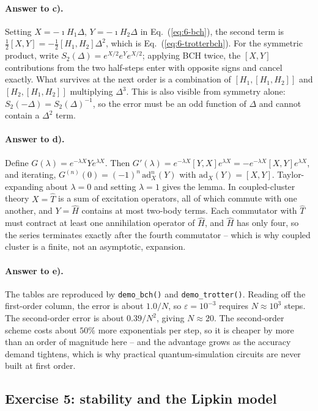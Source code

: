 \paragraph{Answer to c).}
Setting $X=-\imath H_1\Delta$, $Y=-\imath H_2\Delta$ in
Eq.~(\ref{eq:6-bch}), the second term is
$\tfrac12[X,Y]=-\tfrac12[H_1,H_2]\Delta^2$, which is
Eq.~(\ref{eq:6-trotterbch}).  For the symmetric product, write
$S_2(\Delta)=e^{X/2}e^{Y}e^{X/2}$; applying BCH twice, the $[X,Y]$
contributions from the two half-steps enter with opposite signs and cancel
exactly.  What survives at the next order is a combination of
$[H_1,[H_1,H_2]]$ and $[H_2,[H_1,H_2]]$ multiplying $\Delta^3$.  This is also
visible from symmetry alone: $S_2(-\Delta)=S_2(\Delta)^{-1}$, so the error
must be an odd function of $\Delta$ and cannot contain a $\Delta^2$ term.

\paragraph{Answer to d).}
Define $G(\lambda)=e^{-\lambda X}Ye^{\lambda X}$.  Then
$G'(\lambda)=e^{-\lambda X}[Y,X]e^{\lambda X}=-e^{-\lambda X}[X,Y]
e^{\lambda X}$, and iterating,
$G^{(n)}(0)=(-1)^n\,\mathrm{ad}_X^n(Y)$ with
$\mathrm{ad}_X(Y)=[X,Y]$.  Taylor-expanding about $\lambda=0$ and setting
$\lambda=1$ gives the lemma.  In coupled-cluster theory $X=\hat{T}$ is a
sum of excitation operators, all of which commute with one another, and
$Y=\hat{H}$ contains at most two-body terms.  Each commutator with $\hat{T}$
must contract at least one annihilation operator of $\hat{H}$, and $\hat{H}$
has only four, so the series terminates exactly after the fourth commutator --
which is why coupled cluster is a finite, not an asymptotic, expansion.

\paragraph{Answer to e).}
The tables are reproduced by \texttt{demo\_bch()} and
\texttt{demo\_trotter()}.  Reading off the first-order column, the error is
about $1.0/N$, so $\varepsilon=10^{-3}$ requires $N\approx10^{3}$ steps.  The
second-order error is about $0.39/N^2$, giving $N\approx20$.  The second-order
scheme costs about $50\%$ more exponentials per step, so it is cheaper by more
than an order of magnitude here -- and the advantage grows as the accuracy
demand tightens, which is why practical quantum-simulation circuits are never
built at first order.

\subsection*{Exercise 5: stability and the Lipkin model}
\label{ex:6-stability}

